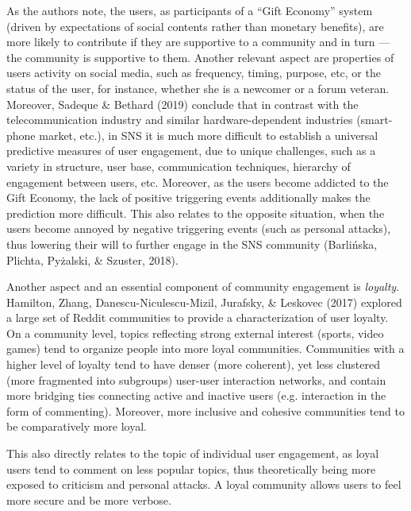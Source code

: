 \documentclass[10pt,dvipsnames]{scrartcl}
\begin{document}
As the authors note, the users, as participants of a ``Gift Economy''
system (driven by expectations of social contents rather than monetary
benefits), are more likely to contribute if they are supportive to a
community and in turn --- the community is supportive to them. Another
relevant aspect are properties of users activity on social media, such
as frequency, timing, purpose, etc, or the status of the user, for
instance, whether she is a newcomer or a forum veteran. Moreover,
Sadeque \& Bethard (2019) conclude that in contrast with the
telecommunication industry and similar hardware-dependent industries
(smart-phone market, etc.), in SNS it is much more difficult to
establish a universal predictive measures of user engagement, due to
unique challenges, such as a variety in structure, user base,
communication techniques, hierarchy of engagement between users, etc.
Moreover, as the users become addicted to the Gift Economy, the lack of
positive triggering events additionally makes the prediction more
difficult. This also relates to the opposite situation, when the users
become annoyed by negative triggering events (such as personal attacks),
thus lowering their will to further engage in the SNS community
(Barlińska, Plichta, Pyżalski, \& Szuster, 2018).

Another aspect and an essential component of community engagement is
\textit{loyalty}. Hamilton, Zhang, Danescu-Niculescu-Mizil, Jurafsky, \&
Leskovec (2017) explored a large set of Reddit communities to provide a
characterization of user loyalty. On a community level, topics
reflecting strong external interest (sports, video games) tend to
organize people into more loyal communities. Communities with a higher
level of loyalty tend to have denser (more coherent), yet less clustered
(more fragmented into subgroups) user-user interaction networks, and
contain more bridging ties connecting active and inactive users (e.g.
interaction in the form of commenting). Moreover, more inclusive and
cohesive communities tend to be comparatively more loyal.

This also directly relates to the topic of individual user engagement,
as loyal users tend to comment on less popular topics, thus
theoretically being more exposed to criticism and personal attacks. A
loyal community allows users to feel more secure and be more verbose.
\end{document}
